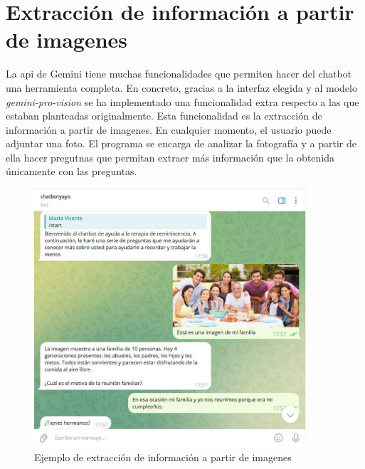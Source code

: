 \section{Extracción de información a partir de imagenes}
\label{sec:imagenes}
La api de Gemini tiene muchas funcionalidades que permiten hacer del chatbot una herramienta completa. En concreto, gracias a la interfaz elegida y al modelo \textit{gemini-pro-vision} se ha implementado una funcionalidad extra respecto a las que estaban planteadas originalmente. Esta funcionalidad es la extracción de información a partir de imagenes. En cualquier momento, el usuario puede adjuntar una foto. El programa se encarga de analizar la fotografía y a partir de ella hacer pregutnas que permitan extraer más información que la obtenida únicamente con las preguntas.
\begin{figure}[h]
	\centering
	\includegraphics[width=0.9\textwidth]{Imagenes/extracInfoImag}
	\caption{Ejemplo de extracción de información a partir de imagenes}
	\label{fig:interfazPrototipo1}
\end{figure}


